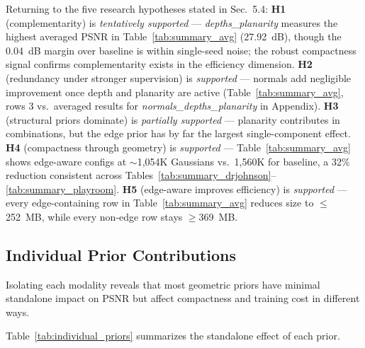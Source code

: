 Returning to the five research hypotheses stated in Sec.~5.4: \textbf{H1} (complementarity) is \textit{tentatively supported} — \textit{depths\_\allowbreak planarity} measures the highest averaged PSNR in Table~\ref{tab:summary_avg} (27.92~dB), though the 0.04~dB margin over baseline is within single-seed noise; the robust compactness signal confirms complementarity exists in the efficiency dimension. \textbf{H2} (redundancy under stronger supervision) is \textit{supported} — normals add negligible improvement once depth and planarity are active (Table~\ref{tab:summary_avg}, rows 3 vs.\ averaged results for \textit{normals\_\allowbreak depths\_\allowbreak planarity} in Appendix). \textbf{H3} (structural priors dominate) is \textit{partially supported} — planarity contributes in combinations, but the edge prior has by far the largest single-component effect. \textbf{H4} (compactness through geometry) is \textit{supported} — Table~\ref{tab:summary_avg} shows edge-aware configs at $\sim$1{,}054K Gaussians vs.\ 1{,}560K for baseline, a 32\% reduction consistent across Tables~\ref{tab:summary_drjohnson}--\ref{tab:summary_playroom}. \textbf{H5} (edge-aware improves efficiency) is \textit{supported} — every edge-containing row in Table~\ref{tab:summary_avg} reduces size to $\leq$252~MB, while every non-edge row stays $\geq$369~MB.

\subsection{Individual Prior Contributions}

Isolating each modality reveals that most geometric priors have minimal standalone impact on PSNR but affect compactness and training cost in different ways.

Table~\ref{tab:individual_priors} summarizes the standalone effect of each prior.

